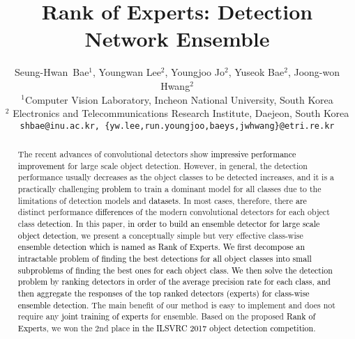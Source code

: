 \documentclass[10pt,twocolumn,letterpaper]{article}
\newcommand{\RE}{\textcolor{black}}
\newcommand{\RV}{\textcolor{black}}
\begin{document}
\title{Rank of Experts: Detection Network Ensemble}



\author{Seung-Hwan~Bae$^{1}$, Youngwan  Lee$^{2}$,  Youngjoo  Jo$^{2}$, Yuseok   Bae$^{2}$, Joong-won  Hwang$^{2}$\\
$^{1}$Computer Vision Laboratory, Incheon National University, South Korea\\
$^{2}$ Electronics and Telecommunications Research Institute, Daejeon, South Korea\\
{\tt\small shbae@inu.ac.kr, \{yw.lee,run.youngjoo,baeys,jwhwang\}@etri.re.kr}
}

\maketitle

\begin{abstract}
The recent advances of convolutional detectors show \RV{impressive performance improvement} for large scale object detection. However, in general, the detection performance  usually decreases as the object classes to be detected increases, and it is a practically challenging  \RV{problem} to train a dominant model for all classes due to the limitations of detection models and  \RV{datasets}. In  most cases, therefore, there \RV{are} distinct performance \RE{differences} of the modern convolutional detectors for each object class \RV{detection}.  In this paper, \RV{in order to build an ensemble detector for large scale object detection}, we present a conceptually simple but very effective  class-wise \RV{ensemble detection which is named as Rank of Experts. We first decompose an intractable problem of finding the best detections for all object classes into small subproblems of finding the best ones for each object class. We then solve the detection problem by ranking detectors in order of the average precision rate for each class, and then aggregate the responses of the top ranked detectors (\ie experts) for class-wise ensemble detection.} The main benefit of our method is easy to implement and does not require any \RE{joint training of experts} for ensemble. Based on the proposed \RE{Rank of Experts}, we won the 2nd place  \RV{in the ILSVRC 2017 object detection competition}.
\end{abstract}
\end{document}
